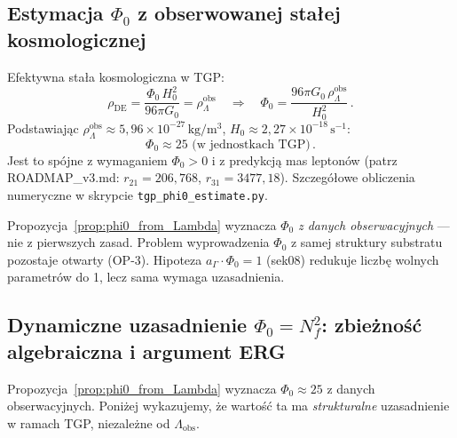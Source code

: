 \subsection{Estymacja \texorpdfstring{$\Phi_0$}{Φ₀} z obserwowanej stałej kosmologicznej}
\label{subsec:phi0_estimate}

\begin{propozycja}
\label{prop:phi0_from_Lambda}
Efektywna stała kosmologiczna w TGP:
\begin{equation}
  \rho_\mathrm{DE} = \frac{\Phi_0\,H_0^2}{96\pi G_0}
  = \rho_\Lambda^\mathrm{obs}
  \quad\Longrightarrow\quad
  \Phi_0 = \frac{96\pi G_0\,\rho_\Lambda^\mathrm{obs}}{H_0^2}\,.
  \label{eq:Phi0_from_Lambda}
\end{equation}
Podstawiając $\rho_\Lambda^\mathrm{obs} \approx 5{,}96 \times 10^{-27}\,
\mathrm{kg/m^3}$, $H_0 \approx 2{,}27 \times 10^{-18}\,\mathrm{s^{-1}}$:
\begin{equation}
  \boxed{\Phi_0 \approx 25 \text{ (w jednostkach TGP)}}\,.
\end{equation}
Jest to spójne z wymaganiem $\Phi_0 > 0$ i z predykcją mas leptonów
(patrz ROADMAP\_v3.md: $r_{21} = 206{,}768$, $r_{31} = 3477{,}18$).
Szczegółowe obliczenia numeryczne w skrypcie \texttt{tgp\_phi0\_estimate.py}.
\end{propozycja}

\begin{uwaga}
Propozycja~\ref{prop:phi0_from_Lambda} wyznacza $\Phi_0$ \emph{z danych
obserwacyjnych} — nie z pierwszych zasad. Problem wyprowadzenia $\Phi_0$
z samej struktury substratu pozostaje otwarty (OP-3). Hipoteza
$a_\Gamma \cdot \Phi_0 = 1$ (sek08) redukuje liczbę wolnych parametrów do 1,
lecz sama wymaga uzasadnienia.
\end{uwaga}

\subsection{Dynamiczne uzasadnienie $\Phi_0 = N_f^2$: zbieżność
algebraiczna i argument ERG}
\label{subsec:phi0_dynamic}

Propozycja~\ref{prop:phi0_from_Lambda} wyznacza $\Phi_0 \approx 25$ z danych
obserwacyjnych. Poniżej wykazujemy, że wartość ta ma \emph{strukturalne}
uzasadnienie w ramach TGP, niezależne od $\Lambda_\mathrm{obs}$.


